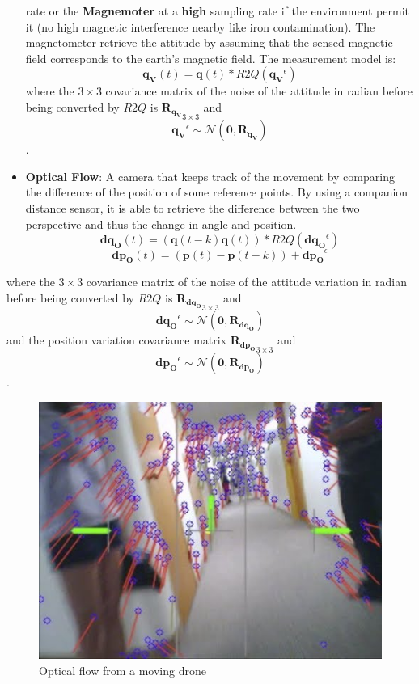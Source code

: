 \documentclass[]{article}
\begin{document}
\begin{itemize}
  rate or the \textbf{Magnemoter} at a \textbf{high} sampling rate if
  the environment permit it (no high magnetic interference nearby like
  iron contamination). The magnetometer retrieve the attitude by
  assuming that the sensed magnetic field corresponds to the earth's
  magnetic field. The measurement model is:
  \[\mathbf{q_V}(t) = \mathbf{q}(t)*R2Q(\mathbf{q_V}^\epsilon)\] where
  the \(3 \times 3\) covariance matrix of the noise of the attitude in
  radian before being converted by \(R2Q\) is
  \({\mathbf{R}_{\mathbf{q_V}}}_{3 \times 3}\) and
  \[\mathbf{q_V}^\epsilon \sim \mathcal{N}(\mathbf{0}, \mathbf{R}_{\mathbf{q_V}})\].
\item
  \textbf{Optical Flow}: A camera that keeps track of the movement by
  comparing the difference of the position of some reference points. By
  using a companion distance sensor, it is able to retrieve the
  difference between the two perspective and thus the change in angle
  and position.
  \[\mathbf{dq_O}(t) = (\mathbf{q}(t-k)\mathbf{q}(t))*R2Q(\mathbf{dq_O}^\epsilon)\]
  \[\mathbf{dp_O}(t) = (\mathbf{p}(t) - \mathbf{p}(t-k)) + \mathbf{dp_O}^\epsilon\]
\end{itemize}

where the \(3 \times 3\) covariance matrix of the noise of the attitude
variation in radian before being converted by \(R2Q\) is
\({\mathbf{R}_{\mathbf{dq_O}}}_{3 \times 3}\) and
\[\mathbf{dq_O}^\epsilon \sim \mathcal{N}(\mathbf{0}, \mathbf{R}_{\mathbf{dq_O}})\]
and the position variation covariance matrix
\({\mathbf{R}_{\mathbf{dp_O}}}_{3 \times 3}\) and
\[\mathbf{dp_O}^\epsilon \sim \mathcal{N}(\mathbf{0}, \mathbf{R}_{\mathbf{dp_O}})\].

\begin{figure}
\centering
\includegraphics{opflow.jpg}
\caption{Optical flow from a moving drone}
\end{figure}
\end{document}
